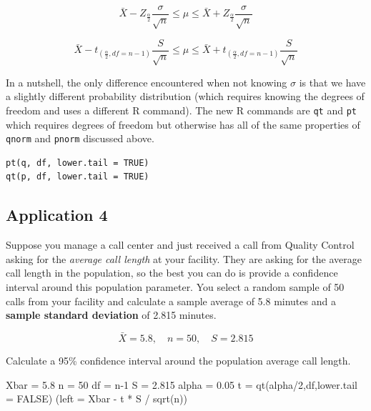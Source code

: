 \documentclass[
]{book}
\newenvironment{Shaded}{\begin{snugshade}}{\end{snugshade}}
\newcommand{\AttributeTok}[1]{\textcolor[rgb]{0.77,0.63,0.00}{#1}}
\newcommand{\ConstantTok}[1]{\textcolor[rgb]{0.00,0.00,0.00}{#1}}
\newcommand{\DecValTok}[1]{\textcolor[rgb]{0.00,0.00,0.81}{#1}}
\newcommand{\FloatTok}[1]{\textcolor[rgb]{0.00,0.00,0.81}{#1}}
\newcommand{\FunctionTok}[1]{\textcolor[rgb]{0.00,0.00,0.00}{#1}}
\newcommand{\NormalTok}[1]{#1}
\newcommand{\OtherTok}[1]{\textcolor[rgb]{0.56,0.35,0.01}{#1}}
\newcommand{\SpecialCharTok}[1]{\textcolor[rgb]{0.00,0.00,0.00}{#1}}
\begin{document}
\[\bar{X}-Z_{\frac{\alpha}{2}}\frac{\sigma}{\sqrt{n}} \leq \mu \leq \bar{X}+Z_{\frac{\alpha}{2}}\frac{\sigma}{\sqrt{n}}\]

\[\bar{X}-t_{(\frac{\alpha}{2},df=n-1)}\frac{S}{\sqrt{n}} \leq \mu \leq \bar{X}+t_{(\frac{\alpha}{2},df=n-1)}\frac{S}{\sqrt{n}}\]

In a nutshell, the only difference encountered when not knowing \(\sigma\) is that we have a slightly different probability distribution (which requires knowing the degrees of freedom and uses a different R command). The new R commands are \texttt{qt} and \texttt{pt} which requires degrees of freedom but otherwise has all of the same properties of \texttt{qnorm} and \texttt{pnorm} discussed above.

\begin{verbatim}
pt(q, df, lower.tail = TRUE)
qt(p, df, lower.tail = TRUE)
\end{verbatim}

\hypertarget{application-4}{%
\subsection{Application 4}\label{application-4}}

Suppose you manage a call center and just received a call from Quality Control asking for the \emph{average call length} at your facility. They are asking for the average call length in the population, so the best you can do is provide a confidence interval around this population parameter. You select a random sample of 50 calls from your facility and calculate a sample average of 5.8 minutes and a \textbf{sample standard deviation} of 2.815 minutes.

\[\bar{X}=5.8, \quad n=50, \quad S=2.815\]

Calculate a 95\% confidence interval around the population average call length.

\begin{Shaded}
\begin{Highlighting}[]
\NormalTok{Xbar }\OtherTok{=} \FloatTok{5.8}
\NormalTok{n }\OtherTok{=} \DecValTok{50}
\NormalTok{df }\OtherTok{=}\NormalTok{ n}\DecValTok{{-}1}
\NormalTok{S }\OtherTok{=} \FloatTok{2.815}
\NormalTok{alpha }\OtherTok{=} \FloatTok{0.05}
\NormalTok{t }\OtherTok{=} \FunctionTok{qt}\NormalTok{(alpha}\SpecialCharTok{/}\DecValTok{2}\NormalTok{,df,}\AttributeTok{lower.tail =} \ConstantTok{FALSE}\NormalTok{)}
\NormalTok{(}\AttributeTok{left =}\NormalTok{ Xbar }\SpecialCharTok{{-}}\NormalTok{ t }\SpecialCharTok{*}\NormalTok{ S }\SpecialCharTok{/} \FunctionTok{sqrt}\NormalTok{(n))}
\end{Highlighting}
\end{Shaded}
\end{document}

